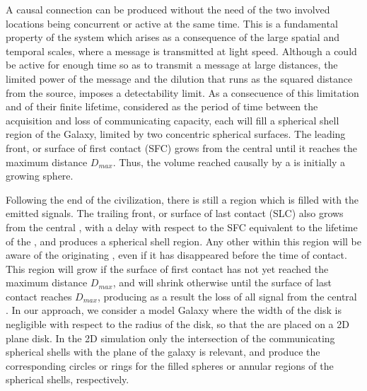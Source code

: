 

          


A causal connection can be produced without the need of the two
involved locations being concurrent or active at the same time.
%
This is a fundamental property of the system which arises as a
consequence of the large spatial and temporal scales, where a message
is transmitted at light speed.
%
Although a \ceti{} could be active for enough time so as to transmit a
message at large distances, the limited power of the message and the
dilution that runs as the squared distance from the source, imposes a
detectability limit.
%
As a consecuence of this limitation and of their finite lifetime,
considered as the period of time between the acquisition and loss of
communicating capacity, each \ceti{} will fill a spherical shell region of
the Galaxy, limited by two concentric spherical surfaces.
%
The leading front, or surface of first contact (SFC) grows from the
central \ceti{} until it reaches the maximum distance $D_{max}$.
%
Thus, the volume reached causally by a \ceti{} is initially a growing
sphere.
   
      



Following the end of the civilization, there is still a region which
is filled with the emitted signals.
%
The trailing front, or surface of last contact (SLC) also grows from
the central \ceti{}, with a delay with respect to the SFC equivalent to
the lifetime of the \ceti{}, and produces a spherical shell region.
%
Any other \ceti{} within this region will be aware of the originating
\ceti{},
even if it has disappeared before the time of contact.
%
This region will grow if the surface of first contact has not yet
reached the maximum distance $D_{max}$, and will shrink otherwise
until the surface of last contact reaches $D_{max}$, producing as a
result the loss of all signal from the central \ceti{}.
%
In our approach, we consider a model Galaxy where the width of the
disk is negligible with respect to the radius of the disk, so that the
\cetis{} are placed on a 2D plane disk.
%
In the 2D simulation only the intersection of the communicating
spherical shells with the plane of the galaxy is relevant, and produce
the corresponding circles or rings for the filled spheres or annular
regions of the spherical shells, respectively.

  


